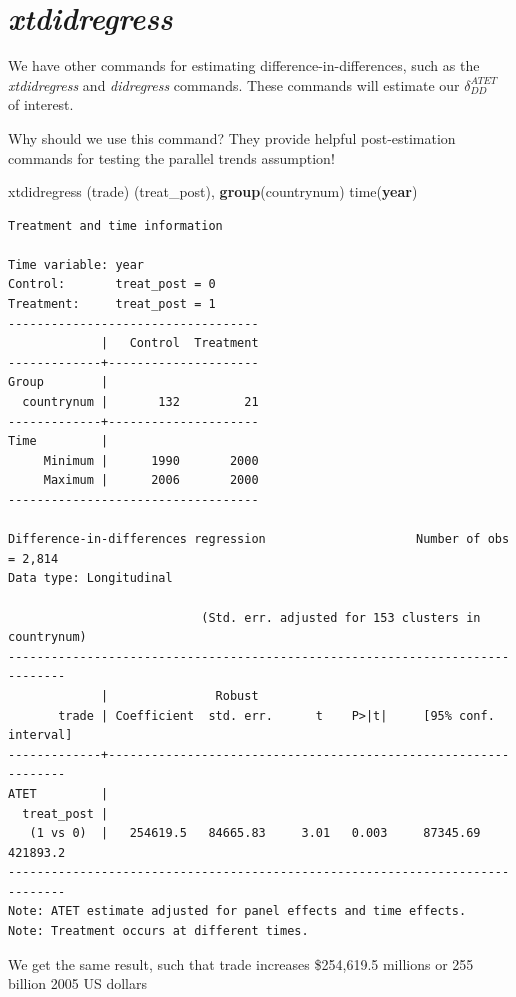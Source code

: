 \documentclass[
]{book}
\newenvironment{Shaded}{\begin{snugshade}}{\end{snugshade}}
\newcommand{\FunctionTok}[1]{\textcolor[rgb]{0.13,0.29,0.53}{\textbf{#1}}}
\newcommand{\NormalTok}[1]{#1}
\begin{document}
\section{\texorpdfstring{\emph{xtdidregress}}{xtdidregress}}\label{xtdidregress}

We have other commands for estimating difference-in-differences, such as the \emph{xtdidregress} and \emph{didregress} commands. These commands will estimate our \(\delta^{ATET}_{DD}\) of interest.

Why should we use this command? They provide helpful post-estimation commands for testing the parallel trends assumption!

\begin{Shaded}
\begin{Highlighting}[]
\NormalTok{xtdidregress (trade) (treat\_post), }\FunctionTok{group}\NormalTok{(countrynum) time(}\FunctionTok{year}\NormalTok{)}
\end{Highlighting}
\end{Shaded}

\begin{verbatim}
Treatment and time information

Time variable: year
Control:       treat_post = 0
Treatment:     treat_post = 1
-----------------------------------
             |   Control  Treatment
-------------+---------------------
Group        |
  countrynum |       132         21
-------------+---------------------
Time         |
     Minimum |      1990       2000
     Maximum |      2006       2000
-----------------------------------

Difference-in-differences regression                     Number of obs = 2,814
Data type: Longitudinal

                           (Std. err. adjusted for 153 clusters in countrynum)
------------------------------------------------------------------------------
             |               Robust
       trade | Coefficient  std. err.      t    P>|t|     [95% conf. interval]
-------------+----------------------------------------------------------------
ATET         |
  treat_post |
   (1 vs 0)  |   254619.5   84665.83     3.01   0.003     87345.69    421893.2
------------------------------------------------------------------------------
Note: ATET estimate adjusted for panel effects and time effects.
Note: Treatment occurs at different times.
\end{verbatim}

We get the same result, such that trade increases \$254,619.5 millions or 255 billion 2005 US dollars
\end{document}
